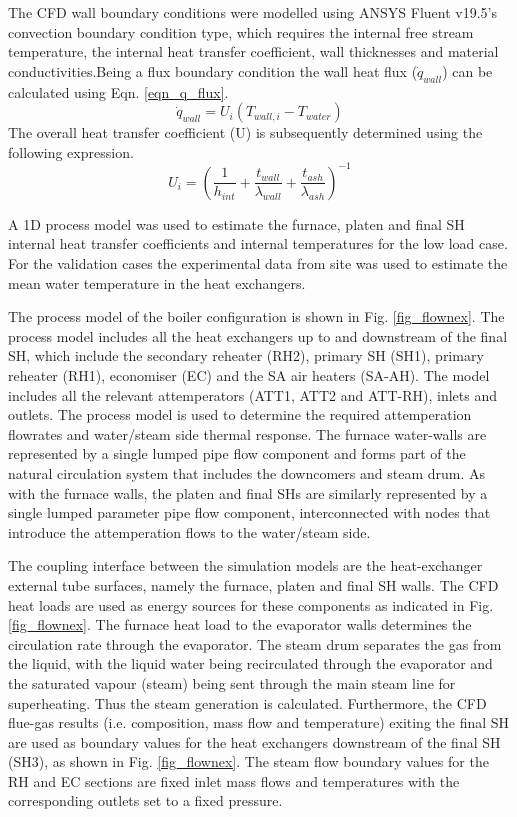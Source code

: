 \documentclass[11pt,cleanfoot]{asme2ej}
\begin{document}
The CFD wall boundary conditions were modelled using ANSYS Fluent v19.5\textsuperscript{\textregistered}’s convection boundary condition type, which requires the internal free stream temperature, the internal heat transfer coefficient, wall thicknesses and material conductivities.Being a flux boundary condition the wall heat flux ($\dot{q}_{wall}$) can be calculated using Eqn. \ref{eqn_q_flux}.
\begin{equation}\label{eqn_q_flux}
\dot{q}_{wall} = U_i(T_{wall,i}-T_{water})
\end{equation}
The overall heat transfer coefficient (U) is subsequently determined using the following expression.
\begin{equation}\label{eqn_overall_heat_coeff}
U_i=\left(\frac{1}{h_{int}}+\frac{t_{wall}}{\lambda_{wall}}+\frac{t_{ash}}{\lambda_{ash}}\right)^{-1}
\end{equation}

A 1D process model was used to estimate the furnace, platen and final SH internal heat transfer coefficients and internal temperatures for the low load case. For the validation cases the experimental data from site was used to estimate the mean water temperature in the heat exchangers.

The process model of the boiler configuration is shown in Fig. \ref{fig_flownex}. The process model includes all the heat exchangers up to and downstream of the final SH, which include the secondary reheater (RH2), primary SH (SH1), primary reheater (RH1), economiser (EC) and the SA air heaters (SA-AH). The model includes all the relevant attemperators (ATT1, ATT2 and ATT-RH), inlets and outlets. The process model is used to determine the required attemperation flowrates and water/steam side thermal response. The furnace water-walls are represented by a single lumped pipe flow component and forms part of the natural circulation system that includes the downcomers and steam drum. As with the furnace walls, the platen and final SHs are similarly represented by a single lumped parameter pipe flow component, interconnected with nodes that introduce the attemperation flows to the water/steam side.

The coupling interface between the simulation models are the heat-exchanger external tube surfaces, namely the furnace, platen and final SH walls. The CFD heat loads are used as energy sources for these components as indicated in Fig. \ref{fig_flownex}. The furnace heat load to the evaporator walls determines the circulation rate through the evaporator. The steam drum separates the gas from the liquid, with the liquid water being recirculated through the evaporator and the saturated vapour (steam) being sent through the main steam line for superheating. Thus the steam generation is calculated. Furthermore, the CFD flue-gas results (i.e. composition, mass flow and temperature) exiting the final SH are used as boundary values for the heat exchangers downstream of the final SH (SH3), as shown in Fig. \ref{fig_flownex}. The steam flow boundary values for the RH and EC sections are fixed inlet mass flows and temperatures with the corresponding outlets set to a fixed pressure.
\end{document}
